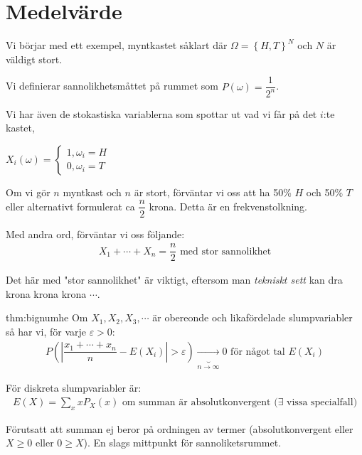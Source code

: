 \section{Medelvärde}\par
\noindent Vi börjar med ett exempel, myntkastet såklart där $\Omega = \left\{H,T\right\}^N$ och $N$ är väldigt stort.\par
\noindent Vi definierar sannolikhetsmåttet på rummet som $P(\omega) = \dfrac{1}{2^n}$.\par
\noindent Vi har även de stokastiska variablerna som spottar ut vad vi får på det $i$:te kastet,\par
\noindent $X_i(\omega) = \begin{cases}1, \omega_i = H\\0, \omega_i = T\end{cases}$
\par\bigskip
\noindent Om vi gör $n$ myntkast och $n$ är stort, förväntar vi oss att ha 50\% $H$ och 50\%  $T$ eller alternativt formulerat ca $\dfrac{n}{2}$ krona. Detta är en frekvenstolkning.
\par\bigskip
\noindent Med andra ord, förväntar vi oss följande:
\begin{equation*}
  \begin{gathered}
    X_1+\cdots+X_n =\dfrac{n}{2} \text{ med stor sannolikhet}
  \end{gathered}
\end{equation*}
\par\bigskip
\noindent Det här med "stor sannolikhet" är viktigt, eftersom man \textit{tekniskt sett} kan dra krona krona krona $\cdots$.
\par\bigskip
\begin{theo}{thm:bignumhe}
  Om $X_1,X_2,X_3,\cdots$ är obereonde och likafördelade slumpvariabler så har vi, för varje $\varepsilon>0$:
  \begin{equation*}
    \begin{gathered}
      P\left(\left|\dfrac{x_1+\cdots+x_n}{n}-E(X_i)\right|>\varepsilon\right)\underbrace{\to}_{\text{$n\to\infty$}} 0\text{ för något tal $E(X_i)$}
    \end{gathered}
  \end{equation*}
  \par\bigskip
  \noindent För diskreta slumpvariabler är:
  \begin{equation*}
    \begin{gathered}
      E(X) = \sum_{x}xP_X(x)\text{ om summan är absolutkonvergent ($\exists$ vissa specialfall)}
    \end{gathered}
  \end{equation*}
  \par\bigskip
  \noindent Förutsatt att summan ej beror på ordningen av termer (absolutkonvergent eller $X\geq0$ eller $0\geq X$). En slags mittpunkt för sannoliketsrummet.
\end{theo}
